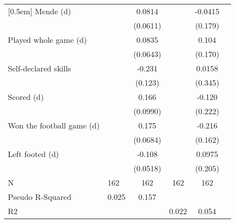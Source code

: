 {\begin{tabularx}{0.8\textwidth}{Xl*{4}{c}}
[0.5em]
Mende (d)           &                     &      0.0814         &                     &     -0.0415         \\
                    &                     &    (0.0611)         &                     &     (0.179)         \\
[0.5em]
Played whole game (d)&                     &      0.0835         &                     &       0.104         \\
                    &                     &    (0.0643)         &                     &     (0.170)         \\
[0.5em]
Self-declared skills&                     &      -0.231\sym{*}  &                     &      0.0158         \\
                    &                     &     (0.123)         &                     &     (0.345)         \\
[0.5em]
Scored (d)          &                     &       0.166\sym{*}  &                     &      -0.120         \\
                    &                     &    (0.0990)         &                     &     (0.222)         \\
[0.5em]
Won the football game (d)&                     &       0.175\sym{**} &                     &      -0.216         \\
                    &                     &    (0.0684)         &                     &     (0.162)         \\
[0.5em]
Left footed (d)     &                     &      -0.108\sym{**} &                     &      0.0975         \\
                    &                     &    (0.0518)         &                     &     (0.205)         \\
\hline
N                   &         162         &         162         &         162         &         162         \\
Pseudo R-Squared    &       0.025         &       0.157         &                     &                     \\
R2                  &                     &                     &       0.022         &       0.054         \\
\hline\hline
\end{tabularx}
}
